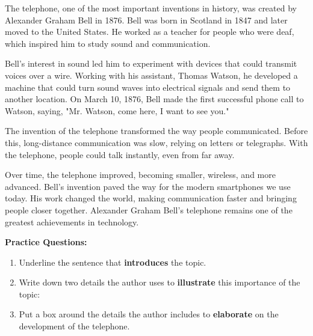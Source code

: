 \documentclass[12pt]{article}
\begin{document}
\vspace{1em}

\begin{tcolorbox}[colframe=black!60, colback=white, 
coltitle=black, colbacktitle=black!15, fonttitle=\bfseries\Large, 
title=Text 2: The Invention of the Telephone, halign title=center, left=10pt, right=10pt, top=10pt, bottom=15pt]
The telephone, one of the most important inventions in history, was created by Alexander Graham Bell in 1876. Bell was born in Scotland in 1847 and later moved to the United States. He worked as a teacher for people who were deaf, which inspired him to study sound and communication.

Bell’s interest in sound led him to experiment with devices that could transmit voices over a wire. Working with his assistant, Thomas Watson, he developed a machine that could turn sound waves into electrical signals and send them to another location. On March 10, 1876, Bell made the first successful phone call to Watson, saying, "Mr. Watson, come here, I want to see you."

The invention of the telephone transformed the way people communicated. Before this, long-distance communication was slow, relying on letters or telegraphs. With the telephone, people could talk instantly, even from far away.

Over time, the telephone improved, becoming smaller, wireless, and more advanced. Bell’s invention paved the way for the modern smartphones we use today. His work changed the world, making communication faster and bringing people closer together. Alexander Graham Bell’s telephone remains one of the greatest achievements in technology.

 
\end{tcolorbox}

\vspace{1em}

\begin{tcolorbox}[colframe=black!60, colback=white, 
coltitle=black, colbacktitle=black!15, fonttitle=\bfseries\Large, 
title=Independent Practice, halign title=center, left=10pt, right=10pt, top=10pt, bottom=15pt]
\textbf{Practice Questions:}
\begin{enumerate}[itemsep=1em]
    \item Underline the sentence that \textbf{introduces} the topic. 
    \item Write down two details the author uses to \textbf{illustrate }this importance of the topic:
\vspace{4em}
    \item Put a box around the details the author includes to \textbf{elaborate} on the development of the telephone.
\end{enumerate}
\end{tcolorbox}
\end{document}
